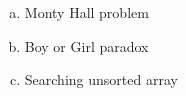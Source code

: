 \begin{frame}{}

  {\large
    \begin{enumerate}[(a)]
      \centering
      \setlength{\itemsep}{6pt}
      \item Monty Hall problem
      \item Boy or Girl paradox
      \item Searching unsorted array
    \end{enumerate}
  }
\end{frame}

% 
